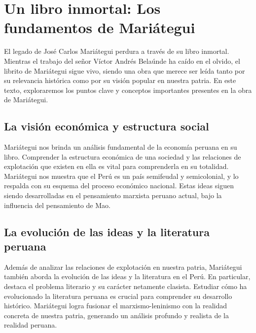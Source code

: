 \documentclass[
  letterpaper,
  DIV=11,
  numbers=noendperiod]{scrartcl}
\begin{document}
\hypertarget{un-libro-inmortal-los-fundamentos-de-mariuxe1tegui}{%
\section{Un libro inmortal: Los fundamentos de
Mariátegui}\label{un-libro-inmortal-los-fundamentos-de-mariuxe1tegui}}

El legado de José Carlos Mariátegui perdura a través de su libro
inmortal. Mientras el trabajo del señor Víctor Andrés Belaúnde ha caído
en el olvido, el librito de Mariátegui sigue vivo, siendo una obra que
merece ser leída tanto por su relevancia histórica como por su visión
popular en nuestra patria. En este texto, exploraremos los puntos clave
y conceptos importantes presentes en la obra de Mariátegui.

\hypertarget{la-visiuxf3n-econuxf3mica-y-estructura-social}{%
\subsection{La visión económica y estructura
social}\label{la-visiuxf3n-econuxf3mica-y-estructura-social}}

Mariátegui nos brinda un análisis fundamental de la economía peruana en
su libro. Comprender la estructura económica de una sociedad y las
relaciones de explotación que existen en ella es vital para comprenderla
en su totalidad. Mariátegui nos muestra que el Perú es un país
semifeudal y semicolonial, y lo respalda con su esquema del proceso
económico nacional. Estas ideas siguen siendo desarrolladas en el
pensamiento marxista peruano actual, bajo la influencia del pensamiento
de Mao.

\hypertarget{la-evoluciuxf3n-de-las-ideas-y-la-literatura-peruana}{%
\subsection{La evolución de las ideas y la literatura
peruana}\label{la-evoluciuxf3n-de-las-ideas-y-la-literatura-peruana}}

Además de analizar las relaciones de explotación en nuestra patria,
Mariátegui también aborda la evolución de las ideas y la literatura en
el Perú. En particular, destaca el problema literario y su carácter
netamente clasista. Estudiar cómo ha evolucionado la literatura peruana
es crucial para comprender su desarrollo histórico. Mariátegui logra
fusionar el marxismo-leninismo con la realidad concreta de nuestra
patria, generando un análisis profundo y realista de la realidad
peruana.
\end{document}
